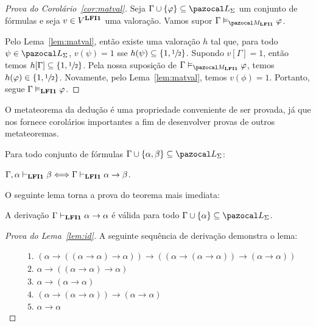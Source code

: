     \begin{proof}[Prova do Corolário~\ref{cor:matval}]
        Seja $\Gamma \cup \{\phi\} \subseteq \ling{}$ um conjunto de fórmulas e seja $v \in V^{{\normalfont\textbf{LFI1}}{}}$ uma valoração. Vamos supor $\Gamma \conmat \phi$.

        Pelo Lema~\ref{lem:matval}, então existe uma valoração $h$ tal que, para todo $\psi \in \ling{}$, $v(\psi) = 1$ sse $h(\psi) \subseteq \{1, \sfrac{1}{2}{}\}$. Supondo $v[\Gamma] = 1$, então temos $h[\Gamma] \subseteq \{1,\sfrac{1}{2}{}\}{}$. Pela nossa suposição de $\Gamma \conmat \phi$, temos $h(\varphi) \in \{1, \sfrac{1}{2}{}\}$. Novamente, pelo Lema~\ref{lem:matval}, temos $v(\phi) = 1$. Portanto, segue $\Gamma \vDash_{{\normalfont\textbf{LFI1}}{}} \varphi$.

    \end{proof}

    O metateorema da dedução é uma propriedade conveniente de ser provada, já que nos fornece corolários importantes a fim de desenvolver provas de outros metateoremas.
    
    \begin{teorema}\label{teo:deducao}
        Para todo conjunto de fórmulas $\Gamma \cup \{\alpha, \beta \} \subseteq \ling{}$:

        \centering
        {\normalfont{} $\Gamma, \alpha \vdash_{{\normalfont\textbf{LFI1}}{}} \beta \Longleftrightarrow \Gamma \vdash_{{\normalfont\textbf{LFI1}}{}} \alpha \to \beta$.}
    \end{teorema}

    O seguinte lema torna a prova do teorema mais imediata:
    \begin{lema}\label{lem:id}
        A derivação $\Gamma \vdash_{{\normalfont\textbf{LFI1}}{}} \alpha \to \alpha$ é válida para todo $\Gamma \cup \{\alpha\} \subseteq \ling{}$.
    \end{lema}
    
    \begin{proof}[Prova do Lema~\ref{lem:id}]
        A seguinte sequência de derivação demonstra o lema:
        
        \begin{align*}
            & \text{1. } (\alpha \to ((\alpha \to \alpha) \to \alpha)) \to ((\alpha \to (\alpha \to \alpha)) \to (\alpha \to \alpha))\tag{Ax2}\\
            & \text{2. } \alpha \to ((\alpha \to \alpha) \to \alpha)\tag{Ax1}\\
            & \text{3. } \alpha \to (\alpha \to \alpha)\tag{Ax1}\\
            & \text{4. } (\alpha \to (\alpha \to \alpha)) \to (\alpha \to \alpha)\tag{MP 1,2}\\
            & \text{5. } \alpha \to \alpha\tag{MP 3,4}
        \end{align*}
    \end{proof}

